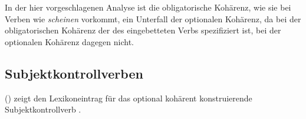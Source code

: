 {In der hier vorgeschlagenen Analyse ist die obligatorische Kohärenz, wie sie bei Verben wie
\emph{scheinen} vorkommt, ein Unterfall der optionalen Kohärenz, da bei der obligatorischen
Kohärenz der \lexw des eingebetteten Verbs spezifiziert ist, bei der optionalen Kohärenz dagegen
nicht.


\subsection{Subjektkontrollverben}
\label{sec-subj-control-analysis}
\label{sec-subject-control-anal}


() zeigt den Lexikoneintrag für das optional kohärent konstruierende Subjektkontrollverb
.

}
